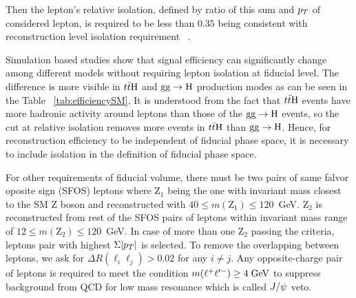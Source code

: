 Then the lepton's relative isolation, defined by ratio of this sum and $p_T$ of considered lepton, is required to be less than $0.35$ being consistent with reconstruction level isolation 
requirement ~\cite{Chatrchyan:2013mxa}. 
\par Simulation based studies show that signal efficiency can significantly change among different models without requiring lepton isolation at fiducial level. The difference is more visible in $t\bar{t}{\rm H}$ and ${\rm gg}\rightarrow{\rm H}$ production modes as can be seen in the Table ~\ref{tab:efficiencySM}. %
It is understood from the fact that $t\bar{t}{\rm H}$ events have more hadronic activity around leptons than those of the ${\rm gg}\rightarrow{\rm H}$ 
events, so the cut at relative isolation removes more events in $t\bar{t}{\rm H}$ than ${\rm gg}\rightarrow{\rm H}$. Hence, for reconstruction efficiency to be independent of fiducial phase space, it is necessary to include isolation in the definition of fiducial phase space.
 \par 
For other requirements of fiducial volume, there must be two pairs of same falvor oposite sign (SFOS) leptons where Z$_{1}$ being the one with invariant mass closest to the SM Z boson and reconstructed with $40 \le m({\mathrm{Z}_1}) \le 120$~GeV. 
Z$_{2}$ is reconstructed from rest of the SFOS pairs of leptons within invariant mass range of $12 \le m({\mathrm{Z}_2}) \le 120$~GeV. 
In case of more than one Z$_{2}$ passing the criteria, leptons pair  with highest  $\Sigma |p_T|$ is selected. To remove the overlapping between leptons, we ask for $\Delta R(\ell_{i}\ell_{j})>0.02$ for any $i\neq j$. 
Any opposite-charge pair of leptons is required to meet the condition $m({\ell^{+}\ell'^{-}}) \ge 4 \hbox{$\;\hbox{\rm GeV}$}$ to suppress background from QCD for low mass resonance which is called $J/\psi$ veto. 

